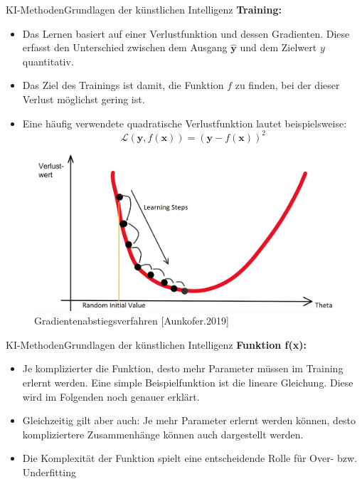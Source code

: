 \documentclass[169, handout	]{THIbeamer} %
\begin{document}
	\begin{frame}{KI-Methoden}{Grundlagen der künstlichen Intelligenz}
		\footnotesize
		\textbf{Training: } 		
		\scriptsize	
		\begin{itemize}
			\item Das Lernen basiert auf einer Verlustfunktion und dessen Gradienten. Diese erfasst den Unterschied zwischen dem Ausgang $\hat{\textbf{y}}$ und dem Zielwert $y$ quantitativ.
			\item Das Ziel des Trainings ist damit, die Funktion $f$ zu finden, bei der dieser Verlust möglichst gering ist. 
			\item Eine häufig verwendete quadratische Verlustfunktion lautet beispielsweise:
			\begin{equation}
				\mathcal{L}(\textbf{y}, f(\textbf{x})) = (\textbf{y} - f(\textbf{x}))^{2}
			\end{equation}
		\end{itemize}	
		\begin{figure}
			\includegraphics[scale=0.2]{required/Loss_function.jpg}
			\caption{\scriptsize Gradientenabstiegsverfahren [Aunkofer.2019]}
        	\label{Machine Learning}
		\end{figure}			
	\end{frame}
	\begin{frame}{KI-Methoden}{Grundlagen der künstlichen Intelligenz}
		\small		
		\textbf{Funktion f(x):}
		\begin{itemize}
			\item Je komplizierter die Funktion, desto mehr Parameter müssen im Training erlernt werden. Eine simple Beispielfunktion ist die lineare Gleichung. Diese wird im Folgenden noch genauer erklärt.
			\item Gleichzeitig gilt aber auch: Je mehr Parameter erlernt werden können, desto kompliziertere Zusammenhänge können auch dargestellt werden. 
			\item Die Komplexität der Funktion spielt eine entscheidende Rolle für Over- bzw. Underfitting
		\end{itemize}
	\end{frame}
\end{document}
